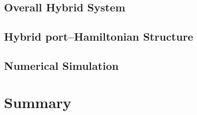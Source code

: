 \subsection{Overall Hybrid System}
\subsection{Hybrid port--Hamiltonian Structure}
\subsection{Numerical Simulation}
%

\clearpage
\section{Summary}
